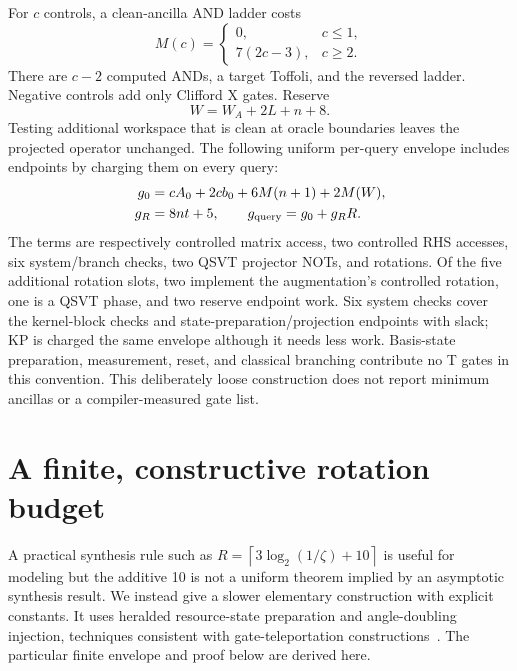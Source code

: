 \documentclass[11pt]{article}
\newcommand{\ceil}[1]{\left\lceil #1\right\rceil}
\begin{document}
For $c$ controls, a clean-ancilla AND ladder costs
\begin{equation}
 M(c)=\begin{cases}0,&c\le1,\\7(2c-3),&c\ge2.\end{cases}
\end{equation}
There are $c-2$ computed ANDs, a target Toffoli, and the reversed ladder. Negative controls add only Clifford X gates. Reserve
\begin{equation}
 W=W_A+2L+n+8.
\end{equation}
Testing additional workspace that is clean at oracle boundaries leaves the projected operator unchanged. The following uniform per-query envelope includes endpoints by charging them on every query:
\begin{align}\label{eq:slot}
 g_0&=cA_0+2cb_0+6M(n+1)+2M(W),\\
 g_R&=8nt+5,\qquad g_{\rm query}=g_0+g_RR.
\end{align}
The terms are respectively controlled matrix access, two controlled RHS accesses, six system/branch checks, two QSVT projector NOTs, and rotations. Of the five additional rotation slots, two implement the augmentation's controlled rotation, one is a QSVT phase, and two reserve endpoint work. Six system checks cover the kernel-block checks and state-preparation/projection endpoints with slack; KP is charged the same envelope although it needs less work. Basis-state preparation, measurement, reset, and classical branching contribute no T gates in this convention. This deliberately loose construction does not report minimum ancillas or a compiler-measured gate list.

\section{A finite, constructive rotation budget}\label{sec:rotation}
A practical synthesis rule such as $R=\ceil{3\log_2(1/\zeta)+10}$ is useful for modeling but the additive 10 is not a uniform theorem implied by an asymptotic synthesis result. We instead give a slower elementary construction with explicit constants. It uses heralded resource-state preparation and angle-doubling injection, techniques consistent with gate-teleportation constructions~\cite{injection}. The particular finite envelope and proof below are derived here.
\end{document}
